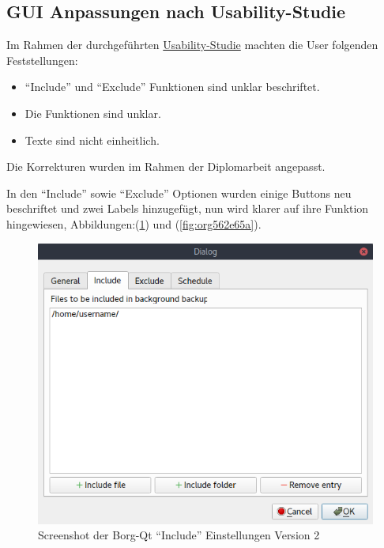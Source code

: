 \subsection{GUI Anpassungen nach Usability-Studie}
\label{sec:org7b2251d}

Im Rahmen der durchgeführten \hyperref[sec:org4a36f83]{Usability-Studie} machten die User folgenden
Feststellungen:
\begin{itemize}
\item "`Include"' und "`Exclude"' Funktionen sind unklar beschriftet.
\item Die Funktionen sind unklar.
\item Texte sind nicht einheitlich.
\end{itemize}

Die Korrekturen wurden im Rahmen der Diplomarbeit angepasst.

In den "`Include"' sowie "`Exclude"' Optionen wurden einige Buttons neu beschriftet
und zwei Labels hinzugefügt, nun wird klarer auf ihre Funktion hingewiesen,
Abbildungen:(\ref{fig:org7af081d}) und
(\ref{fig:org562e65a}).

\begin{figure}[H]
\centering
\includegraphics[width=.9\linewidth]{pictures/borgqt_settings_include_v2.png}
\caption{\label{fig:org7af081d}
Screenshot der Borg-Qt "`Include"' Einstellungen Version 2}
\end{figure}

